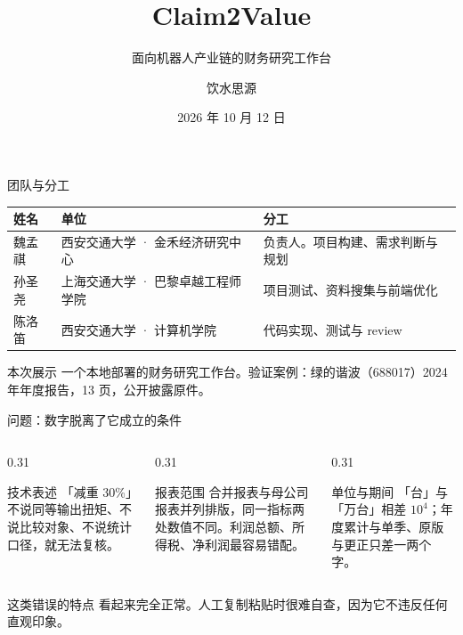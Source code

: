 \documentclass[aspectratio=169,11pt]{ctexbeamer}
\title{Claim2Value}
\subtitle{面向机器人产业链的财务研究工作台}
\author{饮水思源}
\institute{北京大学金融 AI 智能体创新大赛 · 复赛}
\date{2026 年 10 月 12 日}
\begin{document}
\begin{frame}[plain]
\titlepage
\end{frame}

\begin{frame}{团队与分工}
\vspace{0.2cm}
\begin{tabularx}{\textwidth}{@{}l l X@{}}
\toprule
\bfseries 姓名 & \bfseries 单位 & \bfseries 分工 \\
\midrule
魏孟祺 & 西安交通大学 · 金禾经济研究中心 & 负责人。项目构建、需求判断与规划 \\
孙圣尧 & 上海交通大学 · 巴黎卓越工程师学院 & 项目测试、资料搜集与前端优化 \\
陈洛笛 & 西安交通大学 · 计算机学院 & 代码实现、测试与 review \\
\bottomrule
\end{tabularx}

\vspace{0.6cm}
\begin{block}{本次展示}
一个本地部署的财务研究工作台。验证案例：绿的谐波（688017）2024 年年度报告，13 页，公开披露原件。
\end{block}
\end{frame}

\begin{frame}{问题：数字脱离了它成立的条件}
\vspace{0.1cm}
\begin{columns}[T,onlytextwidth]
\begin{column}{0.31\textwidth}
\begin{block}{技术表述}
「减重 30\%」不说同等输出扭矩、不说比较对象、不说统计口径，就无法复核。
\end{block}
\end{column}
\begin{column}{0.31\textwidth}
\begin{block}{报表范围}
合并报表与母公司报表并列排版，同一指标两处数值不同。利润总额、所得税、净利润最容易错配。
\end{block}
\end{column}
\begin{column}{0.31\textwidth}
\begin{block}{单位与期间}
「台」与「万台」相差 $10^4$；年度累计与单季、原版与更正只差一两个字。
\end{block}
\end{column}
\end{columns}

\vspace{0.4cm}
\begin{alertblock}{这类错误的特点}
看起来完全正常。人工复制粘贴时很难自查，因为它不违反任何直观印象。
\end{alertblock}
\end{frame}
\end{document}
